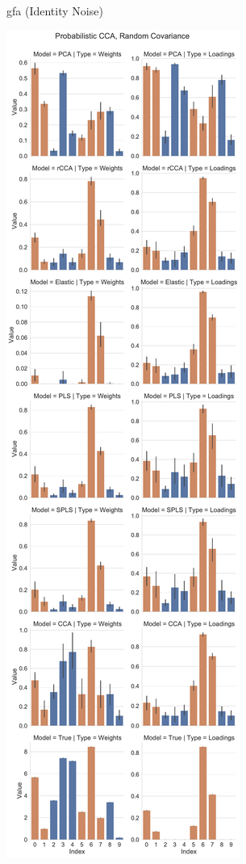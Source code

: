 \begin{figure}
\begin{subfigure}{0.49\linewidth}
        \caption{\acrshort{gfa} (Identity Noise)}
    \end{subfigure}
    \begin{subfigure}{0.49\linewidth}
        \centering
        \includegraphics[width=\linewidth]{figures/simulated/low/Combined_Weights_Loadings_with_Error_Bars_Random_Covariance_explicit}

\end{subfigure}
\end{figure}
